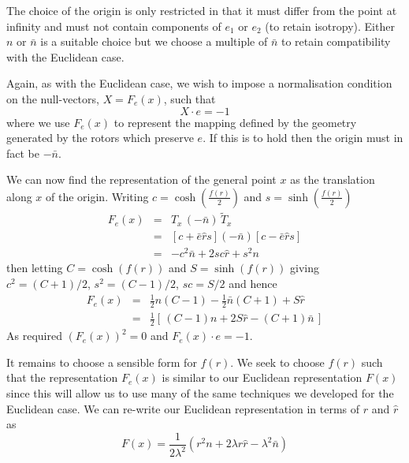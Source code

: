 The choice of the origin is only restricted in that it must differ from the 
point at infinity and must not contain components of $e_1$ or $e_2$ (to retain
isotropy). Either $n$ or $\bar{n}$ is a suitable choice but we choose
a multiple of $\bar{n}$
to retain compatibility with the Euclidean case.

Again, as with the Euclidean case, we wish to impose a normalisation condition 
on the null-vectors, 
$X = F_e(x)$, such that 
\begin{equation}
X \cdot e = -1
\end{equation}
where we use $F_e(x)$ to represent the mapping defined by the geometry
generated by the rotors which
preserve $e$. If this is to hold then the origin must in fact be $-\bar{n}$.

We can now find the representation of the general point $x$ as the translation
along $x$ of the origin. Writing $c = \cosh\left(\frac{f(r)}{2}\right)$ and
$s = \sinh\left(\frac{f(r)}{2}\right)$
\begin{eqnarray}
F_e(x) & = & T_x\,(-\bar{n})\,\tilde{T}_x \\
& = & \left[c + \bar{e}\hat{r}s\right] (-\bar{n}) \left[c - \bar{e}\hat{r}s\right] \\
&=& -c^2\bar{n} + 2sc\hat{r} + s^2n 
\end{eqnarray}
then letting $C = \cosh(f(r))$ and $S = \sinh(f(r))$ giving $c^2 = (C+1) / 2$,
$s^2 = (C-1)/2$, $sc = S/2$ and hence
\begin{eqnarray}
F_e(x) & = & \frac{1}{2}n (C-1) - \frac{1}{2}\bar{n}(C+1) + S\hat{r} \\
& = & \frac{1}{2} \left[ \, (C-1)n + 2S\hat{r} - (C+1)\bar{n} \, \right] 
\end{eqnarray}
As required $(F_e(x))^2 = 0$ and $F_e(x) \cdot e = -1$.

It remains to choose a sensible form for $f(r)$. We seek to choose $f(r)$ such that
the representation $F_e(x)$ is similar to our Euclidean representation $F(x)$
since this will allow us to use many of the same techniques we developed for the
Euclidean case. We can re-write our Euclidean representation 
in terms of $r$ and $\hat{r}$ as
\begin{equation}
F(x) = \frac{1}{2\lambda^2}(r^2n + 2 \lambda r\hat{r} - \lambda^2\bar{n})
\label{eqn:nonEuclidMap1}
\end{equation}

